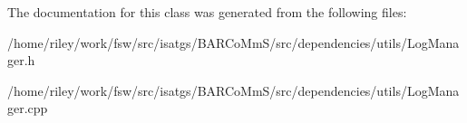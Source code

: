 The documentation for this class was generated from the following files\+:\begin{DoxyCompactItemize}
\item 
/home/riley/work/fsw/src/isatgs/\+B\+A\+R\+Co\+Mm\+S/src/dependencies/utils/Log\+Manager.\+h\item 
/home/riley/work/fsw/src/isatgs/\+B\+A\+R\+Co\+Mm\+S/src/dependencies/utils/Log\+Manager.\+cpp\end{DoxyCompactItemize}
